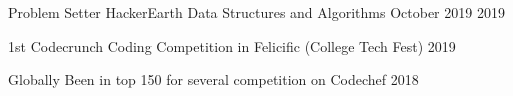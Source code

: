 \begin{cvhonors}

\cvhonor
{Problem Setter} %
{HackerEarth Data Structures and Algorithms October 2019} %
{} %
{2019} %


\cvhonor
{1st} %
{Codecrunch Coding Competition in Felicific (College Tech Fest)} %
{} %
{2019} %


\cvhonor
{Globally} %
{Been in top 150 for several competition on Codechef} %
{} %
{2018} %










\end{cvhonors}
